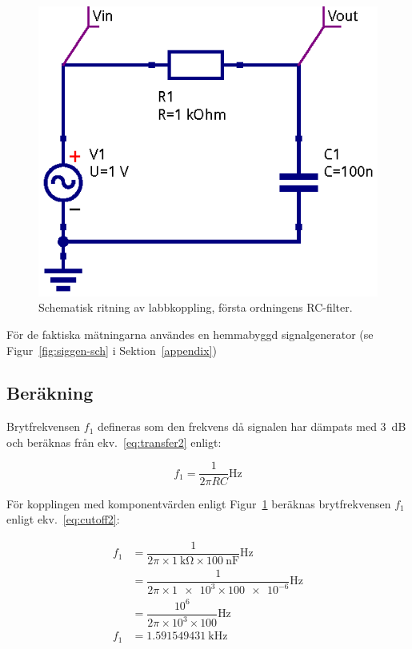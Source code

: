 \begin{figure}\label{fig:rc-schema}
  \centering
  \includegraphics[width=0.8\linewidth]{sim/ee466_lab-4_prj/uppgift-0_schema}
  \caption[Schematisk ritning av labbkoppling, första ordningens RC-filter.]
  {Schematisk ritning av labbkoppling, första ordningens RC-filter.}
\end{figure}

För de faktiska mätningarna användes en hemmabyggd signalgenerator (se
Figur~\ref{fig:siggen-sch} i Sektion~\ref{appendix})


\subsection{Beräkning}
Brytfrekvensen $f_1$ defineras som den frekvens då signalen har dämpats med
\SI{3}{\dB} och beräknas från ekv.~\eqref{eq:transfer2} enligt:

\begin{equation}\label{eq:cutoff}
  f_1 = \dfrac{1}{2 \pi R C} \si{\Hz}
\end{equation}

För kopplingen med komponentvärden enligt Figur~\ref{fig:rc-schema} beräknas
brytfrekvensen $f_1$ enligt ekv.~\eqref{eq:cutoff2}:

\begin{equation}\label{eq:cutoff2}
  \begin{split}
    f_1 &= \dfrac{1}{2 \pi \times \SI{1}{\kohm} \times \SI{100}{\nano\farad}} \si{\Hz} \\
        &= \dfrac{1}{2 \pi \times \num{1e3} \times \num{100e-6}} \si{\Hz}              \\
        &= \dfrac{10^6}{2 \pi \times 10^3 \times \num{100}} \si{\Hz}                   \\
    f_1 &= \SI{1.591549431}{\kHz}
  \end{split}
\end{equation}

